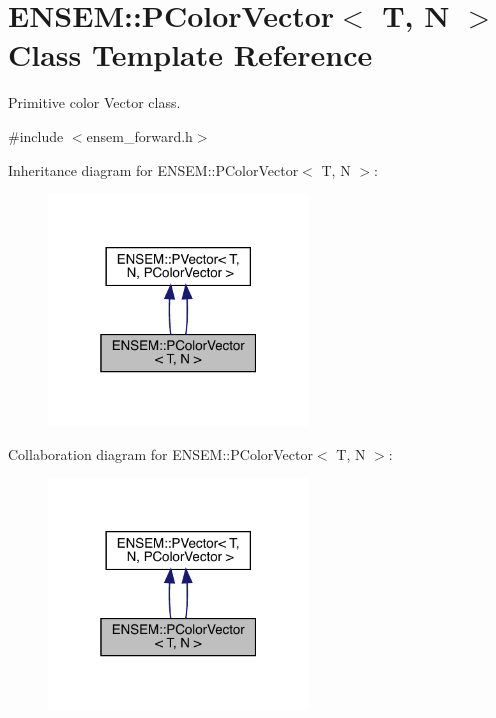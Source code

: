 \hypertarget{classENSEM_1_1PColorVector}{}\section{E\+N\+S\+EM\+:\+:P\+Color\+Vector$<$ T, N $>$ Class Template Reference}
\label{classENSEM_1_1PColorVector}


Primitive color Vector class.  




{\ttfamily \#include $<$ensem\+\_\+forward.\+h$>$}



Inheritance diagram for E\+N\+S\+EM\+:\+:P\+Color\+Vector$<$ T, N $>$\+:\nopagebreak
\begin{figure}[H]
\begin{center}
\leavevmode
\includegraphics[width=196pt]{dd/df3/classENSEM_1_1PColorVector__inherit__graph}
\end{center}
\end{figure}


Collaboration diagram for E\+N\+S\+EM\+:\+:P\+Color\+Vector$<$ T, N $>$\+:\nopagebreak
\begin{figure}[H]
\begin{center}
\leavevmode
\includegraphics[width=196pt]{d2/d34/classENSEM_1_1PColorVector__coll__graph}
\end{center}
\end{figure}
